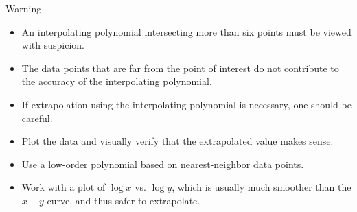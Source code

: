 \documentclass{beamer}
\begin{document}
\begin{frame}{Warning}
\begin{itemize}
\item An interpolating polynomial intersecting more than \alert{six points} must be viewed with suspicion. 
\item The data points that are far from the point of interest do not contribute to the accuracy of the interpolating polynomial. 
\item  If \alert{extrapolation} using the interpolating polynomial is necessary, one should be careful.
\item \alert{Plot the data} and visually verify that the extrapolated value makes sense. 
\item	Use a \alert{low-order polynomial} based on nearest-neighbor data points. 
\item Work with a plot of $\log x$ vs. $\log y$, which is usually much smoother than the $x-y$
curve, and thus safer to extrapolate.
\end{itemize}
\end{frame}
%
%
\end{document}
